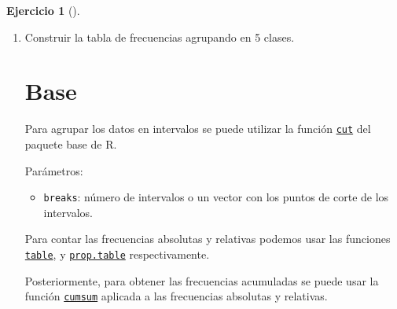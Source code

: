 \documentclass[
  spanish,
  a4paper,
]{scrreport}
\providecommand{\tightlist}{%
  \setlength{\itemsep}{0pt}\setlength{\parskip}{0pt}}
\theoremstyle{definition}
\newtheorem{exercise}{Ejercicio}[chapter]
\theoremstyle{remark}
\begin{document}
\begin{exercise}[]
\begin{enumerate}
\begin{tcolorbox}
  \end{tcolorbox}
\item
  Construir la tabla de frecuencias agrupando en 5 clases.

  \begin{tcolorbox}[enhanced jigsaw, titlerule=0mm, arc=.35mm, rightrule=.15mm, opacitybacktitle=0.6, leftrule=.75mm, colframe=quarto-callout-tip-color-frame, toptitle=1mm, breakable, colbacktitle=quarto-callout-tip-color!10!white, bottomrule=.15mm, colback=white, left=2mm, bottomtitle=1mm, opacityback=0, title=\textcolor{quarto-callout-tip-color}{\faLightbulb}\hspace{0.5em}{Solución}, toprule=.15mm, coltitle=black]

  \section{Base}

  Para agrupar los datos en intervalos se puede utilizar la función
  \href{https://www.rdocumentation.org/packages/base/versions/3.6.2/topics/cut}{\texttt{cut}}
  del paquete base de R.

  Parámetros:

  \begin{itemize}
  \tightlist
  \item
    \texttt{breaks}: número de intervalos o un vector con los puntos de
    corte de los intervalos.
  \end{itemize}

  Para contar las frecuencias absolutas y relativas podemos usar las
  funciones
  \href{https://www.rdocumentation.org/packages/base/versions/3.6.2/topics/table}{\texttt{table}},
  y
  \href{https://www.rdocumentation.org/packages/base/versions/3.6.2/topics/prop.table}{\texttt{prop.table}}
  respectivamente.

  Posteriormente, para obtener las frecuencias acumuladas se puede usar
  la función
  \href{https://www.rdocumentation.org/packages/base/versions/3.6.2/topics/cumsum}{\texttt{cumsum}}
  aplicada a las frecuencias absolutas y relativas.


\end{tcolorbox}
\end{enumerate}
\end{exercise}
\end{document}
